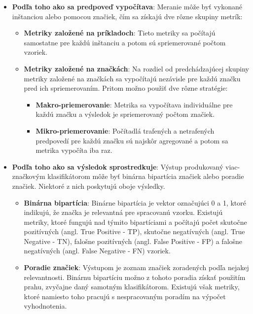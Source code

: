 \begin{itemize}
\item \textbf{Podľa toho ako sa  predpoveď vypočítava}: Meranie môže byť vykonané inštanciou alebo pomocou
značiek, čím sa získajú dve rôzne skupiny metrík:
    \begin{itemize}
    \item \textbf{Metriky založené na príkladoch}: Tieto metriky sa počítajú samostatne pre každú inštanciu a potom sú  spriemerované počtom vzoriek.
    \item \textbf{Metriky založené na značkách}: Na rozdiel od predchádzajúcej skupiny metriky založené na značkách sa vypočítajú nezávisle pre každú značku pred ich spriemerovaním. Pritom možno použiť dve rôzne stratégie:
        \begin{itemize}
        \item \textbf{Makro-priemerovanie}: Metrika sa vypočítava individuálne pre každú značku a
        výsledok je spriemerovaný počtom značiek.
        \item \textbf{Mikro-priemerovanie}: Počítadlá trafených a netrafených predpovedí pre každú značku sú najskôr agregované a potom sa metrika vypočíta iba raz.
        \end{itemize}
    \end{itemize}
\item \textbf{Podľa toho ako sa výsledok sprostredkuje}: Výstup produkovaný viac-značkovým klasifikátorom môže byť binárna bipartícia značiek alebo poradie značiek. Niektoré z nich poskytujú oboje výsledky.
    \begin{itemize}
    \item \textbf{Binárna bipartícia}: Binárne bipartícia je vektor označujúci 0 a 1, ktoré indikujú, že značka je relevantná pre spracovanú vzorku. Existujú metriky, ktoré fungujú nad týmito bipartíciami a počítajú počet skutočne pozitívných (angl. True Positive - TP), skutočne negatívných (angl. True Negative - TN), falošne pozitívných (angl. False Positive - FP) a falošne negatívných (angl. False Negative - FN) vzoriek.
    \item \textbf{Poradie značiek}: Výstupom je zoznam značiek zoradených podľa nejakej relevantnosti. Binárnu bipartíciu možno z tohoto poradia získať použitím prahu, zvyčajne daný samotným klasifikátorom. Existujú však metriky, ktoré namiesto toho pracujú s nespracovaným poradím na výpočet vyhodnotenia.
    \end{itemize}
\end{itemize}

